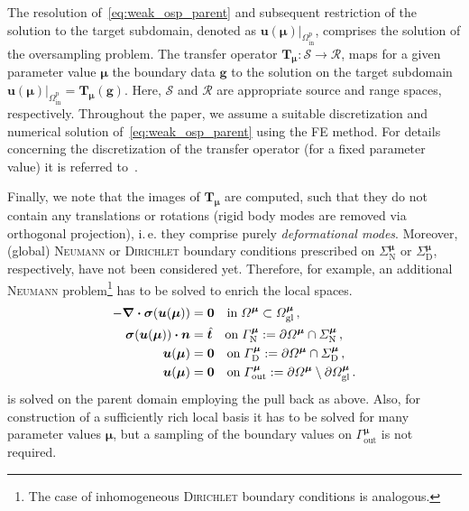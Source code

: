 \documentclass[a4paper]{eccomas_paper-2024}
\makeatletter
\newcommand{\ie}{i.\,e.\@\xspace}
\newcommand{\m}{\bm\mu}
\newcommand{\p}{\mathrm{p}}
\newcommand{\out}{\mathrm{out}}
\newcommand{\inrm}{\mathrm{in}}
\makeatother
\begin{document}
The resolution of~\cref{eq:weak_osp_parent} and subsequent restriction of the solution to the target subdomain, denoted as $\bm{u}(\m)\big\vert_{\varOmega^{\p}_{\inrm}}$, comprises the solution of the oversampling problem.
The transfer operator $\bm{T}_{\m}: \mathcal{S}\to\mathcal{R}$, maps for a given parameter value $\m$ the boundary data $\bm{g}$ to the solution on the target subdomain $\bm{u}(\m)\big\vert_{\varOmega^{\p}_{\inrm}} = \bm{T}_{\m}(\bm{g}).$
Here, $\mathcal{S}$ and $\mathcal{R}$ are appropriate source and range spaces, respectively.
Throughout the paper, we assume a suitable discretization and numerical solution of~\cref{eq:weak_osp_parent} using the FE method.
For details concerning the discretization of the transfer operator (for a fixed parameter value) it is referred to~\cite{Buhr2018Randomized}.

Finally, we note that the images of $\bm{T}_{\m}$ are computed, such that they do not contain any translations or rotations (rigid body modes are removed via orthogonal projection), \ie{} they comprise purely \textit{deformational modes}.
Moreover, (global) \textsc{Neumann} or \textsc{Dirichlet} boundary conditions prescribed on $\varSigma^{\m}_{\mathrm{N}}$ or $\varSigma^{\m}_{\mathrm{D}}$, respectively, have not been considered yet.
Therefore, for example, an additional \textsc{Neumann} problem\footnote{The case of inhomogeneous \textsc{Dirichlet} boundary conditions is analogous.} has to be solved to enrich the local spaces.
\begin{align}
	\begin{split}
	\label{eq:neumann_problem}
    - \div{\bm{\sigma}} (\bm{u}(\bm\mu)) &= \bm{0} \quad  \mathrm{in}\;{\varOmega^{\bm\mu}}\subset\varOmega^{\bm\mu}_{\mathrm{gl}}\,,\\
    \bm{\sigma}(\bm{u}(\bm\mu)) \vdot \bm{n} &= \hat{\bm{t}} \quad \mathrm{on}\; \varGamma^{\m}_{\mathrm{N}}:= \partial\varOmega^{\m}\cap\varSigma^{\m}_{\mathrm{N}}\,,\\
    \bm{u}(\bm\mu) &= \bm{0} \quad  \mathrm{on}\;\varGamma^{\m}_{\mathrm{D}}:=\partial\varOmega^{\m}\cap\varSigma^{\m}_{\mathrm{D}}\,,\\
    \bm{u}(\bm\mu) &= \bm{0}\quad\mathrm{on}\;\varGamma^{\m}_{\mathrm{out}}:= \partial\varOmega^{\m} \setminus\partial\varOmega^{\m}_{\mathrm{gl}}\,.
	\end{split}
\end{align}
 is solved on the parent domain employing the pull back as above.
Also, for construction of a sufficiently rich local basis it has to be solved for many parameter values $\m$, but a sampling of the boundary values on $\varGamma^{\m}_{\out}$ is not required.
\end{document}
